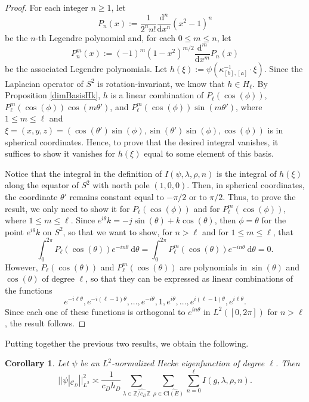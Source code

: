 \documentclass[11pt]{amsart}
\newcommand{\Z}{\mathbb{Z}}
\renewcommand{\a}{\mathfrak{a}}
\newtheorem{corollary}[theorem]{Corollary}
\theoremstyle{definition}
\theoremstyle{remark}
\begin{document}
\begin{proof}
For each integer $n\geq 1$, let $$P_n(x) := \frac{1}{2^{n} n!} \frac{\mathrm{d}^n}{\mathrm{d}x^n} (x^2-1)^n$$ be the $n$-th Legendre polynomial and, for each $0\leq m\leq n$, let $$ P_{n}^{m}(x) := (-1)^m (1-x^2)^{m/2} \frac{\mathrm{d}^{m}}{\mathrm{d}x^{m}} P_n(x)$$ be the associated Legendre polynomials. Let $h(\xi) := \psi(\kappa_{[b],[\a]}^{-1} \cdot \xi)$. Since the Laplacian operator of $S^2$ is rotation-invariant, we know that $h \in H_\ell$. By Proposition \ref{dimBasisHk}, $h$ is a linear combination of $P_{\ell}(\cos(\phi))$, $P_{\ell}^{m}(\cos(\phi)) \cos(m\theta')$, and $P_{\ell}^{m}(\cos(\phi)) \sin(m\theta')$, where $1\leq m\leq \ell$ and $\xi = (x,y,z) = (\cos(\theta') \sin(\phi), \sin(\theta') \sin(\phi), \cos(\phi))$ is in spherical coordinates. Hence, to prove that the desired integral vanishes, it suffices to show it vanishes for $h(\xi)$ equal to some element of this basis.

Notice that the integral in the definition of $I(\psi,\lambda, \rho, n)$ is the integral of $h(\xi)$ along the equator of $S^2$ with north pole $(1,0,0)$. Then, in spherical coordinates, the coordinate $\theta'$ remains constant equal to $-\pi/2$ or to $\pi/2$. Thus, to prove the result, we only need to show it for $P_\ell(\cos(\phi))$ and for $P_{\ell}^{m}(\cos(\phi))$, where $1\leq m\leq \ell$. Since $e^{i\theta}k = -j\sin(\theta) + k\cos(\theta)$, then $\phi=\theta$ for the point $e^{i\theta}k$ on $S^2$, so that we want to show, for $n>\ell$ and for $1\leq m\leq \ell$, that $$ \int_{0}^{2\pi} P_{\ell}(\cos(\theta)) e^{-in\theta} \: \mathrm{d}\theta = \int_{0}^{2\pi} P_{\ell}^{m}(\cos(\theta)) e^{-in\theta} \: \mathrm{d}\theta=0.$$ However, $P_\ell(\cos(\theta))$ and $P_{\ell}^{m}(\cos(\theta))$ are polynomials in $\sin(\theta)$ and $\cos(\theta)$ of degree $\ell$, so that they can be expressed as linear combinations of the functions $$e^{-i\ell \theta}, e^{-i(\ell-1)\theta}, \dots, e^{-i\theta}, 1, e^{i\theta}, \dots, e^{i(\ell-1)\theta}, e^{i\ell \theta}.$$ Since each one of these functions is orthogonal to $e^{in\theta}$ in $L^2([0,2\pi])$ for $n>\ell$, the result follows.
\end{proof}

Putting together the previous two results, we obtain the following.

\begin{corollary}\label{L2FormulaFinite}
Let $\psi$ be an $L^2$-normalized Hecke eigenfunction of degree $\ell$. Then $$ ||\psi|_{\mathcal{C}_{D}}||_{L^2}^{2} \asymp \frac{1}{c_D h_D} \sum_{\lambda \in \widehat{\Z/c_D \Z}} \sum_{\rho \in \widehat{\mathrm{Cl}(E)}} \sum_{n=0}^{\ell} I(g,\lambda, \rho, n).$$
\end{corollary}
\end{document}
